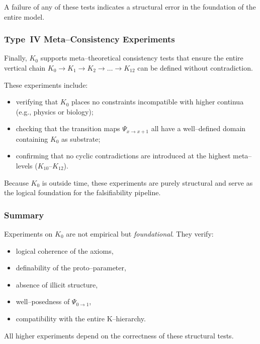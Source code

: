 A failure of any of these tests indicates a structural error in the
foundation of the entire model.


\subsubsection{Type~IV Meta–Consistency Experiments}

Finally, $K_0$ supports meta–theoretical consistency tests that ensure the
entire vertical chain $K_0\to K_1\to K_2\to \dots \to K_{12}$ can be defined
without contradiction.

These experiments include:
\begin{itemize}
    \item verifying that $K_0$ places no constraints incompatible with higher
          continua (e.g., physics or biology);
    \item checking that the transition maps $\Psi_{x\to x+1}$ all have a
          well–defined domain containing $K_0$ as substrate;
    \item confirming that no cyclic contradictions are introduced at the
          highest meta–levels ($K_{10}$–$K_{12}$).
\end{itemize}

Because $K_0$ is outside time, these experiments are purely structural and
serve as the logical foundation for the falsifiability pipeline.


\subsubsection{Summary}

Experiments on $K_0$ are not empirical but \emph{foundational}.  
They verify:

\begin{itemize}
    \item logical coherence of the axioms,
    \item definability of the proto–parameter,
    \item absence of illicit structure,
    \item well–posedness of $\Psi_{0\to1}$,
    \item compatibility with the entire K–hierarchy.
\end{itemize}

All higher experiments depend on the correctness of these structural tests.
